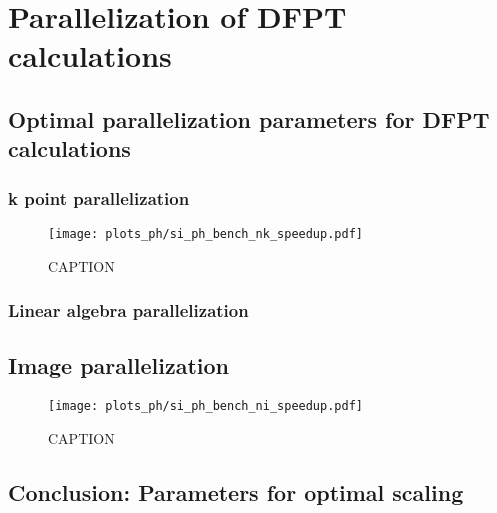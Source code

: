 \documentclass[main.tex]{subfiles}
\begin{document}
\chapter{Parallelization of DFPT calculations}

\section{Optimal parallelization parameters for DFPT calculations}

\subsection{k point parallelization}

\begin{figure}[ht!]
    \centering
    \texttt{[image: plots\_ph/si\_ph\_bench\_nk\_speedup.pdf]}
    \caption{CAPTION}
    \label{fig:scaling_ph_nk_si}
\end{figure}

\subsection{Linear algebra parallelization}

\section{Image parallelization}

\begin{figure}[ht!]
    \centering
    \texttt{[image: plots\_ph/si\_ph\_bench\_ni\_speedup.pdf]}
    \caption{CAPTION}
    \label{fig:scaling_ph_ni_si}
\end{figure}

\section{Conclusion: Parameters for optimal scaling}
\end{document}
